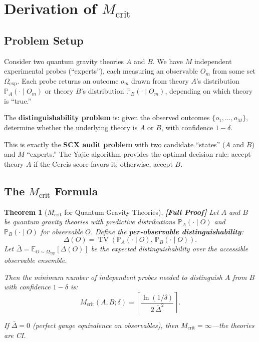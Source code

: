 \documentclass[12pt,a4paper]{article}
\newtheorem{theorem}{Theorem}[section]
\theoremstyle{remark}
\newcommand{\E}{\mathbb{E}}
\newcommand{\Pbb}{\mathbb{P}}
\newcommand{\Yajie}{\textsf{Yajie}}
\newcommand{\Cercis}{\textsf{Cercis}}
\newcommand{\CI}{\textsf{CI}}
\DeclareMathOperator{\TV}{TV}
\newcommand{\rigorFull}{\textbf{[Full Proof]}}
\begin{document}
\section{Derivation of $M_{\text{crit}}$}
\label{sec:mcrit}

\subsection{Problem Setup}

Consider two quantum gravity theories $A$ and $B$. We have $M$ independent experimental probes (``experts''), each measuring an observable $O_m$ from some set $\Omega_{\text{exp}}$. Each probe returns an outcome $o_m$ drawn from theory $A$'s distribution $\Pbb_A(\cdot \mid O_m)$ or theory $B$'s distribution $\Pbb_B(\cdot \mid O_m)$, depending on which theory is ``true.''

The \textbf{distinguishability problem} is: given the observed outcomes $\{o_1, \ldots, o_M\}$, determine whether the underlying theory is $A$ or $B$, with confidence $1 - \delta$.

This is exactly the \textbf{SCX audit problem} with two candidate ``states'' ($A$ and $B$) and $M$ ``experts.'' The \Yajie{} algorithm provides the optimal decision rule: accept theory $A$ if the \Cercis{} score favors it; otherwise, accept $B$.

\subsection{The $M_{\text{crit}}$ Formula}

\begin{theorem}[$M_{\text{crit}}$ for Quantum Gravity Theories]
\label{thm:m_crit}
\rigorFull
Let $A$ and $B$ be quantum gravity theories with predictive distributions $\Pbb_A(\cdot \mid O)$ and $\Pbb_B(\cdot \mid O)$ for observable $O$. Define the \textbf{per-observable distinguishability}:
\begin{equation}
  \Delta(O) = \TV(\Pbb_A(\cdot \mid O),\, \Pbb_B(\cdot \mid O)).
\end{equation}
Let $\bar{\Delta} = \E_{O \sim \Omega_{\text{exp}}}[\Delta(O)]$ be the expected distinguishability over the accessible observable ensemble.

Then the minimum number of independent probes needed to distinguish $A$ from $B$ with confidence $1 - \delta$ is:
\begin{equation}
  \label{eq:m_crit}
  M_{\text{crit}}(A, B; \delta) = \left\lceil
  \frac{\ln(1/\delta)}{2\,\bar{\Delta}^2}
  \right\rceil.
\end{equation}

If $\bar{\Delta} = 0$ (perfect gauge equivalence on observables), then $M_{\text{crit}} = \infty$---the theories are \CI.
\end{theorem}
\end{document}
